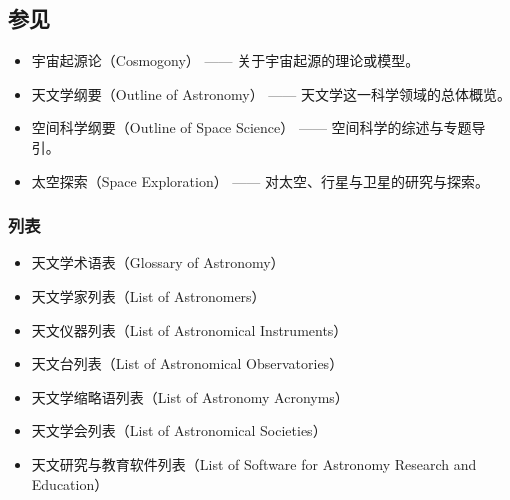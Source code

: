\subsection{参见}
\begin{itemize}
  \item 宇宙起源论（Cosmogony） —— 关于宇宙起源的理论或模型。
  \item 天文学纲要（Outline of Astronomy） —— 天文学这一科学领域的总体概览。
  \item 空间科学纲要（Outline of Space Science） —— 空间科学的综述与专题导引。
  \item 太空探索（Space Exploration） —— 对太空、行星与卫星的研究与探索。
\end{itemize}
\subsubsection{列表}
\begin{itemize}
  \item 天文学术语表（Glossary of Astronomy）
  \item 天文学家列表（List of Astronomers）
  \item 天文仪器列表（List of Astronomical Instruments）
  \item 天文台列表（List of Astronomical Observatories）
  \item 天文学缩略语列表（List of Astronomy Acronyms）
  \item 天文学会列表（List of Astronomical Societies）
  \item 天文研究与教育软件列表（List of Software for Astronomy Research and Education）
\end{itemize}
